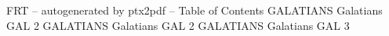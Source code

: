 \id FRT -- autogenerated by ptx2pdf --
\is Table of Contents
\tr {} GALATIANS Galatians GAL 2
\tr {} GALATIANS Galatians GAL 2
\tr {} GALATIANS Galatians GAL 3
